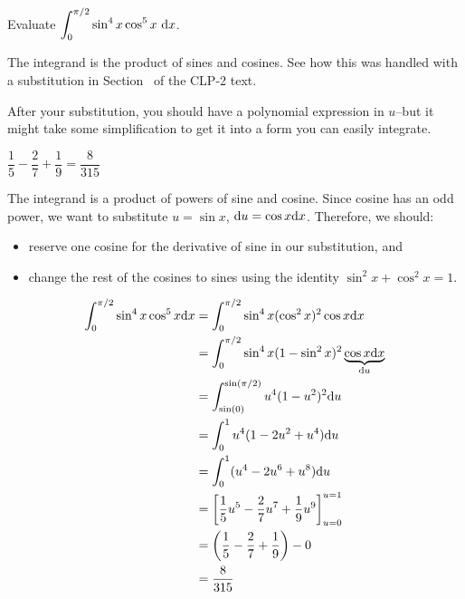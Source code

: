 


\subsection*{\Procedural}

\begin{question} Evaluate
$\displaystyle\int_0^{{\pi}/{2}} \sin^4 x \cos^5 x~ \mathrm{d}x$.
\end{question}

\begin{hint}
The integrand is the product of sines and cosines. See how this was handled with a substitution in Section~ of the CLP-2 text.%

After your substitution, you should have a polynomial expression in $u$--but it might take some simplification to get it into a form you can easily integrate.
\end{hint}

\begin{answer}
$\dfrac{1}{5}-\dfrac{2}{7}+\dfrac{1}{9}
=\dfrac{8}{315}$
\end{answer}

\begin{solution}

The integrand is a product of powers of sine and cosine. Since cosine has an odd power, we want to substitute $u=\sin x$, $\mathrm{d}u=\cos x \mathrm{d}x$. Therefore, we should:
\begin{itemize}
\item reserve one cosine for the derivative of sine in our substitution, and
\item change the rest of the cosines to sines using the identity $\sin^2x+\cos^2x=1$.
\end{itemize}
\begin{align*}
\int_0^{\pi/2}\sin^4x\cos^5x\mathrm{d}x&=
\int_{0}^{\pi/2}\sin^4x(\cos^2x)^2\cos x\mathrm{d}x\\
&=\int_{0}^{\pi/2}\sin^4x(1-\sin^2x)^2\underbrace{\cos x\mathrm{d}x}_{\mathrm{d}u}\\
&=
\int_{\sin(0)}^{\sin(\pi/2)}u^4(1-u^2)^2\mathrm{d}u\\
&=
\int_{0}^{1}u^4(1-2u^2+u^4)\mathrm{d}u\\
&=
\int_{0}^{1}(u^4-2u^6+u^8)\mathrm{d}u\\
&=\left[
\frac{1}{5}u^5-\frac{2}{7}u^7+\frac{1}{9}u^9
\right]_{u=0}^{u=1}\\
&=
\left(\frac{1}{5}-\frac{2}{7}+\frac{1}{9}\right)
-
0\\
&=\dfrac{8}{315}
\end{align*}
\end{solution}



